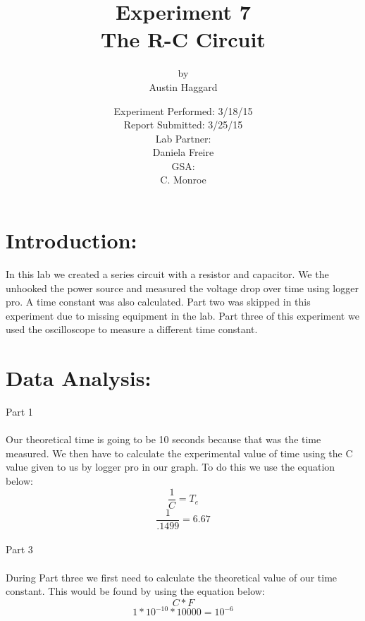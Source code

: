 \documentclass{article}
\title{Experiment 7 \\ The R-C Circuit}
\author{by \\ Austin Haggard}
\date{
	Experiment Performed: 3/18/15 \\
	Report Submitted: 3/25/15 \\[11pt]
	Lab Partner: \\ Daniela Freire \\[11pt] 
	GSA: \\ C. Monroe
}
\begin{document}
\maketitle
\thispagestyle{empty}
\newpage

\section*{Introduction:}
\setcounter{page}{1}
In this lab we created a series circuit with a resistor and capacitor.  We the unhooked the power source and measured the voltage drop over time using logger pro.  A time constant was also calculated.  Part two was skipped in this experiment due to missing equipment in the lab. Part three of this experiment we used the oscilloscope to measure a different time constant.   
\newpage


\section*{Data Analysis:}
\setcounter{page}{3}
Part 1
\\ \\
Our theoretical time is going to be 10 seconds because that was the time measured.  We then have to calculate the experimental value of time using the C value given to us by logger pro in our graph.  To do this we use the equation below: \[\frac{1}{C} = T_e\]
\[\frac{1}{.1499} = 6.67\]
\\
Part 3
\\ \\ 
During Part three we first need to calculate the theoretical value of our time constant.  This would be found by using the equation below:
\[C*F\]
\[1*10^{-10}*10000 = 10^{-6}\]
\end{document}
